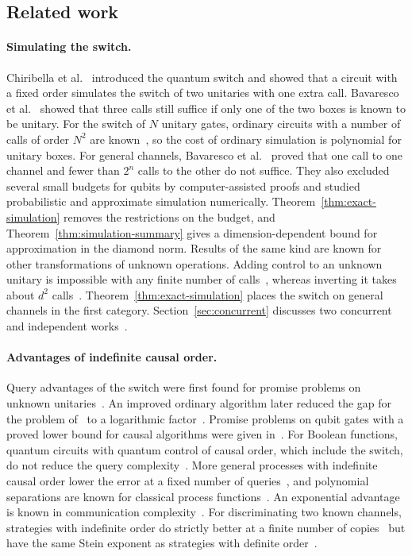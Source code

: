 \documentclass[11pt,letterpaper]{article}
\theoremstyle{definition}\newtheorem{definition}[theorem]{Definition}
\begin{document}
\subsection{Related work}\label{sec:related}

\paragraph{Simulating the switch.}
Chiribella et al.~\cite{chiribella2013} introduced the quantum switch
and showed that a circuit with a fixed order simulates the switch of
two unitaries with one extra call. Bavaresco et
al.~\cite{bavaresco2025} showed that three calls still suffice if only
one of the two boxes is known to be unitary. For the switch of $N$
unitary gates, ordinary circuits with a number of calls of order $N^2$
are known~\cite{colnaghi2012,facchini2015}, so the cost of ordinary
simulation is polynomial for unitary boxes. For general channels,
Bavaresco et al.~\cite{bavaresco2025} proved that one call to one
channel and fewer than $2^n$ calls to the other do not suffice. They
also excluded several small budgets for qubits by computer-assisted
proofs and studied probabilistic and approximate simulation
numerically. Theorem~\ref{thm:exact-simulation} removes the
restrictions on the budget, and Theorem~\ref{thm:simulation-summary}
gives a dimension-dependent bound for approximation in the diamond
norm. Results of the same kind are known for other transformations of
unknown operations. Adding control to an unknown unitary is impossible
with any finite number of calls~\cite{gavorova2024}, whereas inverting
it takes about $d^2$ calls~\cite{odake2025}.
Theorem~\ref{thm:exact-simulation} places the switch on general
channels in the first category. Section~\ref{sec:concurrent} discusses
two concurrent and independent works~\cite{cheng2026,goldin2026}.

\paragraph{Advantages of indefinite causal order.}
Query advantages of the switch were first found for promise problems on
unknown unitaries~\cite{chiribella2012,araujo2014}. An improved ordinary
algorithm later reduced the gap for the problem of~\cite{araujo2014} to
a logarithmic factor~\cite{renner2021}. Promise problems on qubit gates
with a proved lower bound for causal algorithms were given
in~\cite{renner2022}. For Boolean functions, quantum circuits with
quantum control of causal order, which include the switch, do not reduce
the query complexity~\cite{abbott2024}. More general processes with
indefinite causal order lower the error at a fixed number of
queries~\cite{abbott2024}, and polynomial separations are known for
classical process functions~\cite{abbott2025}. An exponential advantage is known in
communication complexity~\cite{guerin2016}. For discriminating two known
channels, strategies with indefinite order do strictly better at a
finite number of copies~\cite{bavaresco2021} but have the same Stein
exponent as strategies with definite order~\cite{zhuwang2026}.
\end{document}
